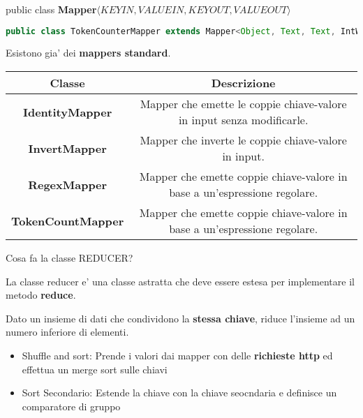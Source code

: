 public class \textbf{Mapper}$\langle KEYIN,VALUEIN,KEYOUT,VALUEOUT \rangle$

\begin{lstlisting}[language=Java]
    public class TokenCounterMapper extends Mapper<Object, Text, Text, IntWritable>
\end{lstlisting}

Esistono gia' dei \textbf{mappers standard}.

\begin{table}[H]
    \begin{center}
        \begin{tabular}{|c|c|}
            \hline
            \textbf{Classe}           & \textbf{Descrizione}                                                      \\
            \hline
            \textbf{IdentityMapper}   & Mapper che emette le coppie chiave-valore in input senza modificarle.     \\
            \hline
            \textbf{InvertMapper}     & Mapper che inverte le coppie chiave-valore in input.                      \\
            \hline
            \textbf{RegexMapper}      & Mapper che emette coppie chiave-valore in base a un'espressione regolare. \\
            \hline
            \textbf{TokenCountMapper} & Mapper che emette coppie chiave-valore in base a un'espressione regolare. \\
            \hline
        \end{tabular}
    \end{center}
\end{table}

\begin{domanda}
    Cosa fa la classe REDUCER?
\end{domanda}

La classe reducer e' una classe astratta che deve essere estesa per
implementare il metodo \textbf{reduce}.

Dato un insieme di dati che condividono la \textbf{stessa chiave}, riduce
l'insieme ad un numero inferiore di elementi.

\begin{itemize}
    \item Shuffle and sort: Prende i valori dai mapper con delle \textbf{richieste http}
          ed effettua un merge sort sulle chiavi
    \item Sort Secondario: Estende la chiave con la chiave seocndaria e definisce un
          comparatore di gruppo
\end{itemize}

